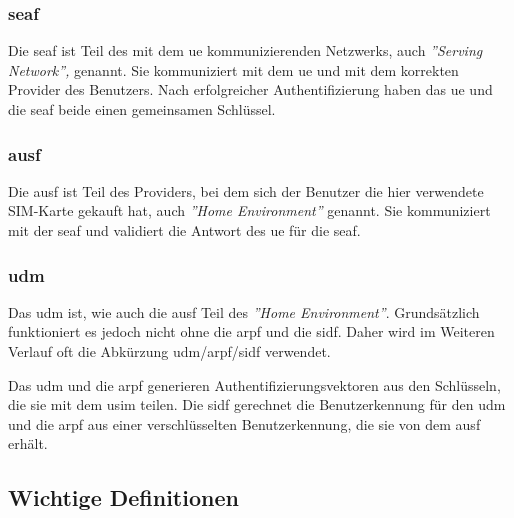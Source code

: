 \subsubsection{\gls{seaf}}

Die \gls{seaf} ist Teil des mit dem \gls{ue} kommunizierenden Netzwerks, auch \textit{''Serving Network''‚} genannt.
Sie kommuniziert mit dem \gls{ue} und mit dem korrekten Provider des Benutzers.
Nach erfolgreicher Authentifizierung haben das \gls{ue} und die \gls{seaf} beide einen gemeinsamen Schl\"ussel.%

\subsubsection{\gls{ausf}}

Die \gls{ausf} ist Teil des Providers, bei dem sich der Benutzer die hier verwendete SIM-Karte gekauft hat, auch \textit{''Home Environment''} genannt.
Sie kommuniziert mit der \gls{seaf} und validiert die Antwort des \gls{ue} f\"ur die \gls{seaf}.

\subsubsection{\gls{udm}}

Das \gls{udm} ist, wie auch die \gls{ausf} Teil des \textit{''Home Environment''}.
Grunds\"atzlich funktioniert es jedoch nicht ohne die \gls{arpf} und die \gls{sidf}.
Daher wird im Weiteren Verlauf oft die Abk\"urzung \gls{udm}/\gls{arpf}/\gls{sidf} verwendet.

Das \gls{udm} und die \gls{arpf} generieren Authentifizierungsvektoren aus den Schl\"usseln, die sie mit dem \gls{usim} teilen.
Die \gls{sidf} gerechnet die Benutzerkennung f\"ur den \gls{udm} und die \gls{arpf} aus einer verschl\"usselten Benutzerkennung, die sie von dem \gls{ausf} erh\"alt.


\subsection{Wichtige Definitionen}


